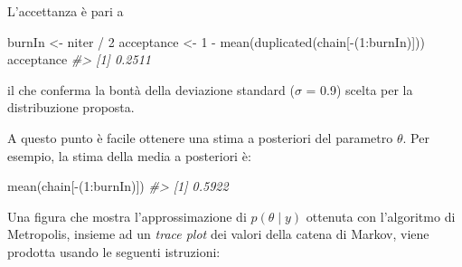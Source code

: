 \documentclass[
  11pt,
]{krantz}
\makeatletter
\newenvironment{Shaded}{\begin{snugshade}}{\end{snugshade}}
\newcommand{\CommentTok}[1]{\textcolor[rgb]{0.37,0.37,0.37}{\textit{#1}}}
\newcommand{\DecValTok}[1]{\textcolor[rgb]{0.06,0.06,0.06}{#1}}
\newcommand{\FunctionTok}[1]{\textcolor[rgb]{0,0,0}{#1}}
\newcommand{\NormalTok}[1]{#1}
\newcommand{\OtherTok}[1]{\textcolor[rgb]{0.37,0.37,0.37}{#1}}
\newcommand{\SpecialCharTok}[1]{\textcolor[rgb]{0,0,0}{#1}}
\newenvironment{kframe}{%
\medskip{}
\setlength{\fboxsep}{.8em}
 \def\at@end@of@kframe{}%
 \ifinner\ifhmode%
  \def\at@end@of@kframe{\end{minipage}}%
  \begin{minipage}{\columnwidth}%
 \fi\fi%
 \def\FrameCommand##1{\hskip\@totalleftmargin \hskip-\fboxsep
 \colorbox{shadecolor}{##1}\hskip-\fboxsep
     \hskip-\linewidth \hskip-\@totalleftmargin \hskip\columnwidth}%
 \MakeFramed {\advance\hsize-\width
   \@totalleftmargin\z@ \linewidth\hsize
   \@setminipage}}%
 {\par\unskip\endMakeFramed%
 \at@end@of@kframe}
\renewenvironment{Shaded}{\begin{kframe}}{\end{kframe}}
\theoremstyle{definition}
\theoremstyle{definition}
\theoremstyle{definition}
\theoremstyle{definition}
\theoremstyle{remark}
\makeatother
\begin{document}
L'accettanza è pari a

\begin{Shaded}
\begin{Highlighting}[]
\NormalTok{burnIn }\OtherTok{\textless{}{-}}\NormalTok{ niter }\SpecialCharTok{/} \DecValTok{2}
\NormalTok{acceptance }\OtherTok{\textless{}{-}} \DecValTok{1} \SpecialCharTok{{-}} \FunctionTok{mean}\NormalTok{(}\FunctionTok{duplicated}\NormalTok{(chain[}\SpecialCharTok{{-}}\NormalTok{(}\DecValTok{1}\SpecialCharTok{:}\NormalTok{burnIn)]))}
\NormalTok{acceptance}
\CommentTok{\#\textgreater{} [1] 0.2511}
\end{Highlighting}
\end{Shaded}

\noindent il che conferma la bontà della deviazione standard (\(\sigma\) = 0.9) scelta per la distribuzione proposta.

A questo punto è facile ottenere una stima a posteriori del parametro \(\theta\). Per esempio, la stima della media a posteriori è:

\begin{Shaded}
\begin{Highlighting}[]
\FunctionTok{mean}\NormalTok{(chain[}\SpecialCharTok{{-}}\NormalTok{(}\DecValTok{1}\SpecialCharTok{:}\NormalTok{burnIn)])}
\CommentTok{\#\textgreater{} [1] 0.5922}
\end{Highlighting}
\end{Shaded}

Una figura che mostra l'approssimazione di \(p(\theta \mid y)\) ottenuta con l'algoritmo di Metropolis, insieme ad un \emph{trace plot} dei valori della catena di Markov, viene prodotta usando le seguenti istruzioni:
\end{document}
